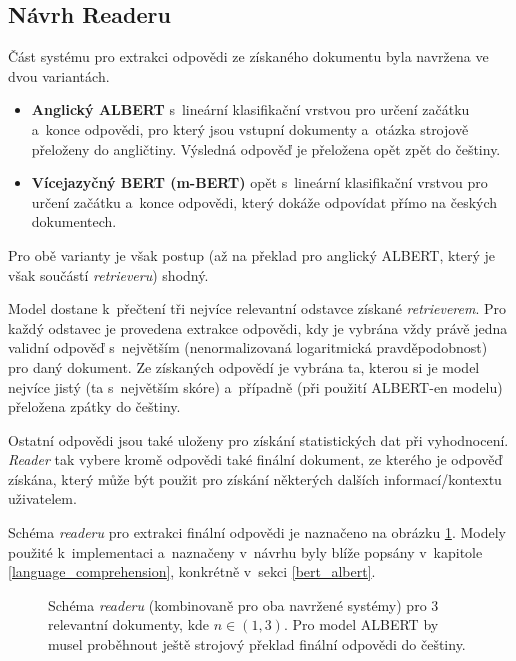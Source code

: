 \subsection{Návrh Readeru}
Část systému pro extrakci odpovědi ze získaného dokumentu byla navržena ve dvou variantách.
\begin{itemize}
    \item \textbf{Anglický ALBERT} s~lineární klasifikační vrstvou pro určení začátku a~konce odpovědi, pro který jsou vstupní dokumenty a~otázka strojově přeloženy do angličtiny. Výsledná odpověď je přeložena opět zpět do češtiny.
    \item \textbf{Vícejazyčný BERT (m-BERT)} opět s~lineární klasifikační vrstvou pro určení začátku a~konce odpovědi, který dokáže odpovídat přímo na českých dokumentech.
\end{itemize}
Pro obě varianty je však postup (až na překlad pro anglický ALBERT, který je však součástí \emph{retrieveru}) shodný.\par
Model dostane k~přečtení tři nejvíce relevantní odstavce získané \emph{retrieverem}. Pro každý odstavec je provedena extrakce odpovědi, kdy je vybrána vždy právě jedna validní odpověď s~největším (nenormalizovaná logaritmická pravděpodobnost) pro daný dokument. Ze získaných odpovědí je vybrána ta, kterou si je model nejvíce jistý (ta s~největším skóre) a~případně (při použití ALBERT-en modelu) přeložena zpátky do češtiny.\par
\noindent Ostatní odpovědi jsou také uloženy pro získání statistických dat při vyhodnocení. \emph{Reader} tak vybere kromě odpovědi také finální dokument, ze kterého je odpověď získána, který může být použit pro získání některých dalších informací/kontextu uživatelem.\par
Schéma \emph{readeru} pro extrakci finální odpovědi je naznačeno na obrázku \ref{reader_schema}. Modely použité k~implementaci a~naznačeny v~návrhu byly blíže popsány v~kapitole \ref{language_comprehension}, konkrétně v~sekci \ref{bert_albert}.

\begin{figure}[hbt]
	\centering
	\caption{Schéma \emph{readeru} (kombinovaně pro oba navržené systémy) pro 3 relevantní dokumenty, kde $n \in (1,3)$. Pro model ALBERT by musel proběhnout ještě strojový překlad finální odpovědi do češtiny.}
	\label{reader_schema}
\end{figure}

